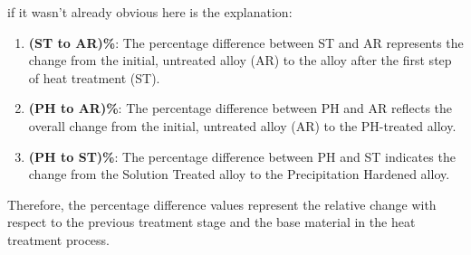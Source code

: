 \documentclass{article}
\begin{document}
{if it wasn't already obvious here is the explanation:
\begin{enumerate}[itemsep=-1mm]
    \item \textbf{(ST to AR)\%}: The percentage difference between ST and AR represents the change from the initial, untreated alloy (AR) to the alloy after the first step of heat treatment (ST).
    \item \textbf{(PH to AR)\%}: The percentage difference between PH and AR reflects the overall change from the initial, untreated alloy (AR) to the PH-treated alloy.
    \item \textbf{(PH to ST)\%}: The percentage difference between PH and ST indicates the change from the Solution Treated alloy to the Precipitation Hardened alloy.
\end{enumerate}
Therefore, the percentage difference values represent the relative change with respect to the previous treatment stage and the base material in the heat treatment process.

  
    \newpage\restoregeometry\vspace*{-30pt}
}
\end{document}
